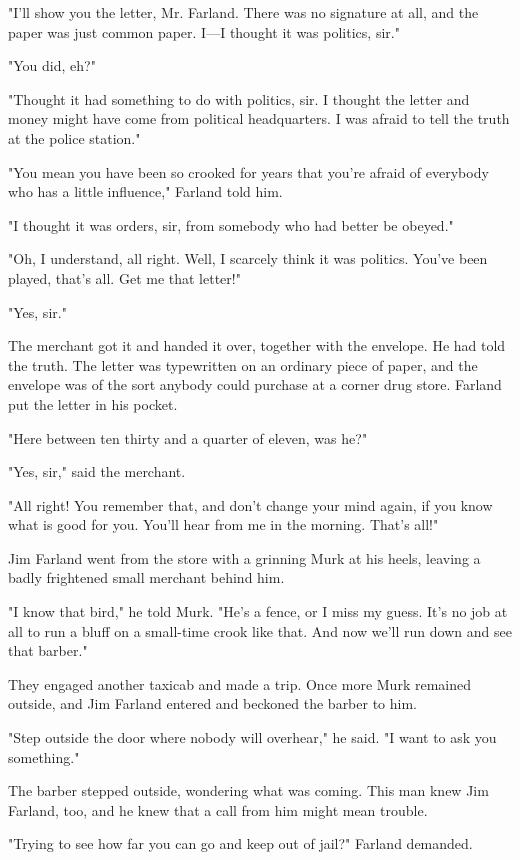 \documentclass{novel}
\begin{document}
"I'll show you the letter, Mr. Farland. There was no signature at all, and the paper was just common paper. I---I thought it was politics, sir."

"You did, eh?"

"Thought it had something to do with politics, sir. I thought the letter and money might have come from political headquarters. I was afraid to tell the truth at the police station."

"You mean you have been so crooked for years that you're afraid of everybody who has a little influence," Farland told him.

"I thought it was orders, sir, from somebody who had better be obeyed."

"Oh, I understand, all right. Well, I scarcely think it was politics. You've been played, that's all. Get me that letter!"

"Yes, sir."

The merchant got it and handed it over, together with the envelope. He had told the truth. The letter was typewritten on an ordinary piece of paper, and the envelope was of the sort anybody could purchase at a corner drug store. Farland put the letter in his pocket.

"Here between ten thirty and a quarter of eleven, was he?"

"Yes, sir," said the merchant.

"All right! You remember that, and don't change your mind again, if you know what is good for you. You'll hear from me in the morning. That's all!"

Jim Farland went from the store with a grinning Murk at his heels, leaving a badly frightened small merchant behind him.

"I know that bird," he told Murk. "He's a fence, or I miss my guess. It's no job at all to run a bluff on a small-time crook like that. And now we'll run down and see that barber."

They engaged another taxicab and made a trip. Once more Murk remained outside, and Jim Farland entered and beckoned the barber to him.

"Step outside the door where nobody will overhear," he said. "I want to ask you something."

The barber stepped outside, wondering what was coming. This man knew Jim Farland, too, and he knew that a call from him might mean trouble.

"Trying to see how far you can go and keep out of jail?" Farland demanded.
\end{document}
